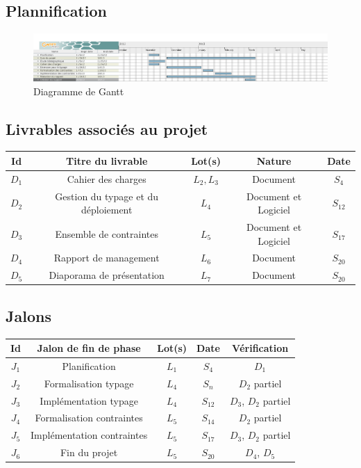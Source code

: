 \documentclass[a4paper]{article}
\begin{document}
\subsection{Plannification}
\begin{figure}[!ht]
	\centering
	\includegraphics[scale=.3]{imgs/gantt.png}
	\caption{\label{gantt} Diagramme de Gantt}
\end{figure}
\subsection{Livrables associés au projet}
\begin{center}
\begin{tabular}{c|c|c|c|c}
	\textbf{Id} & \textbf{Titre du livrable} & \textbf{Lot(s)} & \textbf{Nature} & \textbf{Date} \\
	\hline
	\hline
	$D_1$ & Cahier des charges & $L_2, L_3$ & Document & $S_4$ \\
	\hline
	$D_2$ & Gestion du typage et du déploiement & $L_4$ & Document et Logiciel & $S_{12}$ \\
	\hline
	$D_3$ & Ensemble de contraintes & $L_5$ & Document et Logiciel & $S_{17}$ \\
	\hline
	$D_4$ & Rapport de management & $L_6$ & Document & $S_{20}$ \\
	\hline
	$D_5$ & Diaporama de présentation & $L_7$ & Document & $S_{20}$ \\
\end{tabular}
\end{center}

\subsection{Jalons}
\begin{center}
\begin{tabular}{c|c|c|c|c}
	\textbf{Id} & \textbf{Jalon de fin de phase} & \textbf{Lot(s)} & \textbf{Date} & \textbf{Vérification} \\
	\hline
	\hline
	$J_1$ & Planification & $L_1$ & $S_4$ & $D_1$ \\
	\hline
	$J_2$ & Formalisation typage & $L_4$ & $S_n$ & $D_2$ partiel \\
	\hline
	$J_3$ & Implémentation typage & $L_4$ & $S_{12}$ & $D_3$, $D_2$ partiel \\
	\hline
	$J_4$ & Formalisation contraintes & $L_5$ & $S_{14}$ & $D_2$ partiel \\
	\hline
	$J_5$ & Implémentation contraintes & $L_5$ & $S_{17}$ & $D_3$, $D_2$ partiel \\
	\hline
	$J_6$ & Fin du projet & $L_5$ & $S_{20}$ & $D_4$, $D_5$ \\
\end{tabular}
\end{center}
\end{document}
